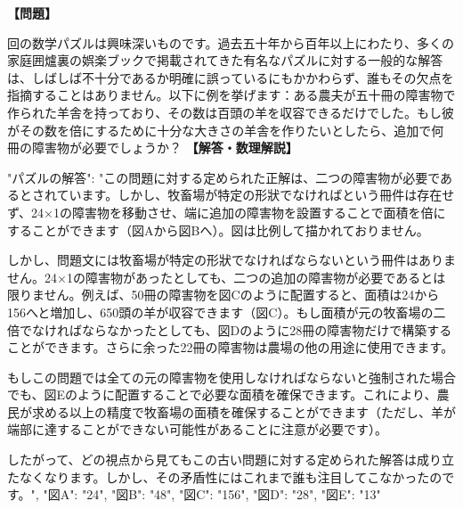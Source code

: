 \documentclass[10pt,a4paper,oneside,openany]{ltjsbook}
\begin{document}
\begin{tcolorbox}[colback=softblue,colframe=primaryblue,title=\textbf{第 193 問：THE SHEEPFOLD.},arc=2mm,boxrule=1pt,breakable]
\textbf{【問題】}\par\vspace{0.3em}
回の数学パズルは興味深いものです。過去五十年から百年以上にわたり、多くの家庭囲爐裏の娯楽ブックで掲載されてきた有名なパズルに対する一般的な解答は、しばしば不十分であるか明確に誤っているにもかかわらず、誰もその欠点を指摘することはありません。以下に例を挙げます：ある農夫が五十冊の障害物で作られた羊舎を持っており、その数は百頭の羊を収容できるだけでした。もし彼がその数を倍にするために十分な大きさの羊舎を作りたいとしたら、追加で何冊の障害物が必要でしょうか？
\tcblower
\textbf{【解答・数理解説】}\par\vspace{0.3em}
{
  "パズルの解答": "この問題に対する定められた正解は、二つの障害物が必要であるとされています。しかし、牧畜場が特定の形狀でなければという冊件は存在せず、24×1の障害物を移動させ、端に追加の障害物を設置することで面積を倍にすることができます（図Aから図Bへ）。図は比例して描かれておりません。

しかし、問題文には牧畜場が特定の形狀でなければならないという冊件はありません。24×1の障害物があったとしても、二つの追加の障害物が必要であるとは限りません。例えば、50冊の障害物を図Cのように配置すると、面積は24から156へと増加し、650頭の羊が収容できます（図C）。もし面積が元の牧畜場の二倍でなければならなかったとしても、図Dのように28冊の障害物だけで構築することができます。さらに余った22冊の障害物は農場の他の用途に使用できます。

もしこの問題では全ての元の障害物を使用しなければならないと強制された場合でも、図Eのように配置することで必要な面積を確保できます。これにより、農民が求める以上の精度で牧畜場の面積を確保することができます（ただし、羊が端部に達することができない可能性があることに注意が必要です）。

したがって、どの視点から見てもこの古い問題に対する定められた解答は成り立たなくなります。しかし、その矛盾性にはこれまで誰も注目してこなかったのです。",
  "図A": "24",
  "図B": "48",
  "図C": "156",
  "図D": "28",
  "図E": "13"
}
\end{tcolorbox}
\end{document}
